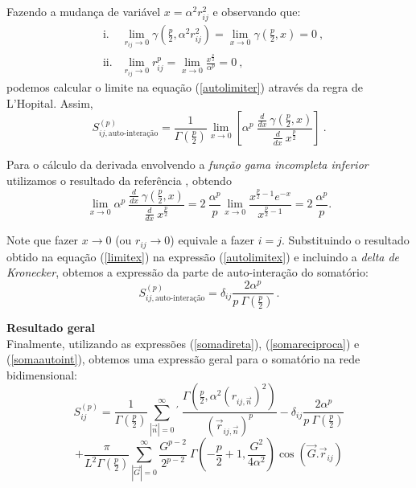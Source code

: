 \documentclass[twocolumn,a4,11pt]{article}
\begin{document}
Fazendo a mudança de variável $x=\alpha^{2} r_{ij}^{2}$ e observando que:
\begin{eqnarray*}
& \text{i.} &
\lim_{r_{ij} \rightarrow 0}  \gamma\left(\frac{p}{2},\alpha^{2} r_{ij}^{2}\right)=\lim_{x \rightarrow 0}  \gamma\left(\frac{p}{2},x\right) = 0 ~,
\\
& \text{ii.} &
\lim_{r_{ij} \rightarrow 0} r_{ij}^{p}=\lim_{x \rightarrow 0} \frac {x^{\frac{p}{2}}}{\alpha^{p}} = 0 ~,
\end{eqnarray*}
podemos calcular o limite na equação (\ref{autolimiter}) através da regra de L'Hopital. Assim,
\begin{equation}
S_{ij,\text{auto-interação}}^{(p)}=
\frac{1}{\Gamma\left(\frac{p}{2}\right) } \lim_{x \rightarrow 0} \left[
\alpha^{p} ~ \frac{ \frac{d}{dx} ~ \gamma\left(\frac{p}{2},x\right)}
{\frac{d}{dx} ~ x^{\frac{p}{2}}} \right]~.
\label{autolimitex}
\end{equation}

Para o cálculo da derivada envolvendo a {\it função gama incompleta inferior} utilizamos o resultado da referência \cite{GRAD}, obtendo
\begin{equation}
\lim_{x \rightarrow 0} 
\alpha^{p} ~ \frac{ \frac{d}{dx} ~ \gamma\left(\frac{p}{2},x\right)}
{\frac{d}{dx} ~ x^{\frac{p}{2}}}=
2 ~ \frac{ \alpha^{p}}{p}
\lim_{x \rightarrow 0} 
\frac{ x^{\frac{p}{2}-1}e^{-x} }
{ x^{\frac{p}{2}-1} } = 2 ~ \frac{ \alpha^{p}}{p} .
\label{limitex}
\end{equation}

Note que fazer $x \rightarrow 0$ (ou $r_{ij} \rightarrow 0$) equivale a fazer $i=j$. Substituindo o resultado obtido na equação (\ref{limitex}) na expressão (\ref{autolimitex}) e incluindo a {\it delta de Kronecker}, obtemos a expressão da parte de auto-interação do somatório:
\begin{equation}
S_{ij,\text{auto-interação}}^{(p)}=  \delta_{ij} \frac{2 \alpha^{p}}{p ~ \Gamma\left(\frac{p}{2}\right)} ~.
\label{somaautoint}
\end{equation}
\vspace{0.2cm}

\noindent
{\bf Resultado geral}\\
Finalmente, utilizando as expressões (\ref{somadireta}), (\ref{somareciproca}) e (\ref{somaautoint}), obtemos uma expressão geral para o somatório na rede bidimensional:
\begin{equation}
S_{ij}^{(p)}=\frac{1}{\Gamma\left(\frac{p}{2}\right) }
\sum_{|\vec{n}|=0}^{\infty} {}^{\prime} ~
\frac{\Gamma\left(\frac{p}{2},\alpha^{2} (r_{ij,\vec{n}})^{2}\right)
}{{(\vec{r}_{ij,\vec{n}})^{p}}} 
-\delta_{ij} \frac{2\alpha^{p}}{p ~ \Gamma\left(\frac{p}{2}\right)}
\nonumber
\end{equation}
\begin{equation}
+\frac{\pi}{L^{2} \Gamma\left(\frac{p}{2}\right) }
\sum_{|\vec{G}|=0}^{\infty}
\frac{G^{p-2}}{2^{p-2}} ~
\Gamma\left(-\frac{p}{2}+1,\frac{G^{2}}{4 \alpha^{2}}\right)
\cos(\vec{G}.\vec{r}_{ij}) \label{resultadogeral}
\end{equation}
\end{document}
